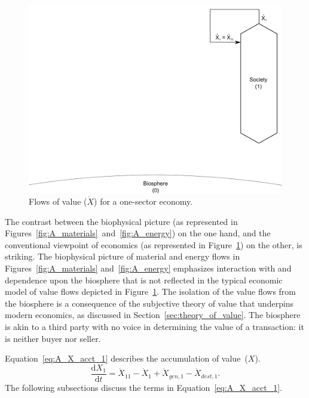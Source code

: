 \begin{landscape}
\begin{figure}[!ht]
\centering
\includegraphics[width=0.8\linewidth]{Part_2/Chapter_Values/images/1_sector_value.pdf}
\caption[Flows of value for a one-sector economy]{Flows of value ($\dot{X}$) for a one-sector economy.}
\label{fig:A_value} 
\end{figure}
\end{landscape}

The contrast between the biophysical picture
(as represented in Figures~\ref{fig:A_materials}~and~\ref{fig:A_energy})
on the one hand, 
and the conventional viewpoint of economics
(as represented in Figure~\ref{fig:A_value}) 
on the other, is striking.  
The biophysical picture of material and energy flows in 
Figures~\ref{fig:A_materials} and~\ref{fig:A_energy} 
emphasizes interaction with and dependence upon the biosphere 
that is not reflected in the typical economic model of 
value flows depicted in Figure~\ref{fig:A_value}.
The isolation of the value flows from the biosphere is a consequence
of the subjective theory of value
that underpins modern economics, as discussed in 
Section~\ref{sec:theory_of_value}.
The biosphere is akin to a third party with no voice 
in determining the value of a transaction:
it is neither buyer nor seller. 

Equation~\ref{eq:A_X_acct_1} describes the accumulation 
of value~($X$).
%
\begin{equation} \label{eq:A_X_acct_1}
	\frac{\mathrm{d}X_{1}}{\mathrm{d}t} 
	= \dot{X}_{11} 
	- \dot{X}_{1}
	+ \dot{X}_{gen,1}
	- \dot{X}_{dest,1}.
\end{equation}
%
The following subsections discuss the terms in Equation~\ref{eq:A_X_acct_1}.
%

